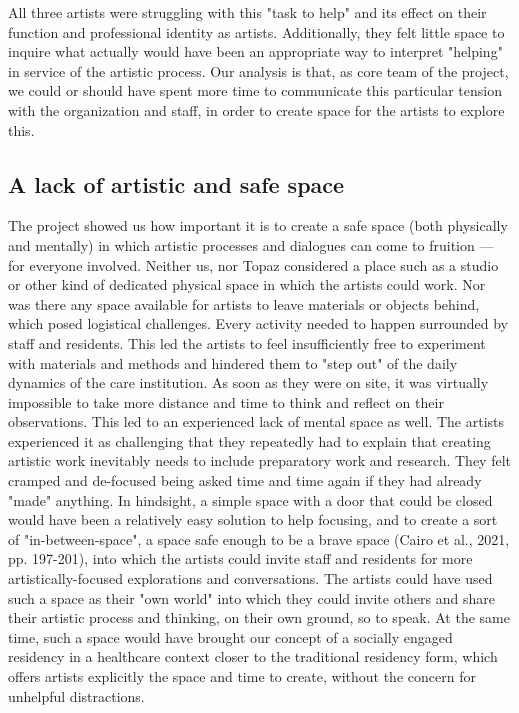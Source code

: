 \documentclass[authordate, empirical,issue]{jote-new-article}
\begin{document}
{	All three artists were struggling with this "task to help" and its effect on their function and professional identity as artists. Additionally, they felt little space to inquire what actually would have been an appropriate way to interpret "helping" in service of the artistic process. Our analysis is that, as core team of the project, we could or should have spent more time to communicate this particular tension with the organization and staff, in order to create space for the artists to explore this.



	\subsection{A lack of artistic and safe space}



	The project showed us how important it is to create a safe space (both physically and mentally) in which artistic processes and dialogues can come to fruition --- for everyone involved. Neither us, nor Topaz considered a place such as a studio or other kind of dedicated physical space in which the artists could work. Nor was there any space available for artists to leave materials or objects behind, which posed logistical challenges. Every activity needed to happen surrounded by staff and residents. This led the artists to feel insufficiently free to experiment with materials and methods and hindered them to "step out" of the daily dynamics of the care institution. As soon as they were on site, it was virtually impossible to take more distance and time to think and reflect on their observations. This led to an experienced lack of mental space as well. The artists experienced it as challenging that they repeatedly had to explain that creating artistic work inevitably needs to include preparatory work and research. They felt cramped and de-focused being asked time and time again if they had already "made" anything. In hindsight, a simple space with a door that could be closed would have been a relatively easy solution to help focusing, and to create a sort of "in-between-space", a space safe enough to be a brave space (Cairo et al., 2021, pp. 197-201), into which the artists could invite staff and residents for more artistically-focused explorations and conversations. The artists could have used such a space as their "own world" into which they could invite others and share their artistic process and thinking, on their own ground, so to speak. At the same time, such a space would have brought our concept of a socially engaged residency in a healthcare context closer to the traditional residency form, which offers artists explicitly the space and time to create, without the concern for unhelpful distractions.







}
\end{document}
